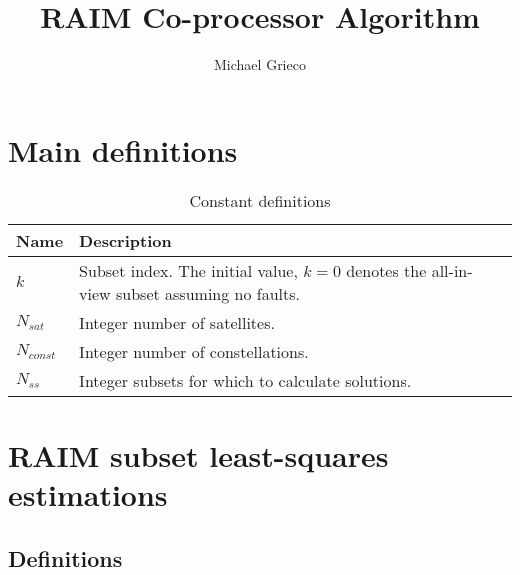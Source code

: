 \documentclass[11pt]{article}
\title{RAIM Co-processor Algorithm}
\author{Michael Grieco}
\date{}
\begin{document}
\section{Main definitions}

\begin{table}[htbp] \centering
  \caption{Constant definitions}\label{tab:exp}
  \begin{tabular}{|m{2cm}|m{11cm}|}
    \hline
    \textbf{Name} & \textbf{Description}\\ \hline
    $k$ & Subset index. The initial value, $k=0$ denotes the all-in-view subset assuming no faults.\\ \hline
    $N_{sat}$ & Integer number of satellites.\\ \hline
    $N_{const}$ & Integer number of constellations.\\ \hline
    $N_{ss}$ & Integer subsets for which to calculate solutions.\\ \hline
  \end{tabular}
\end{table}

\section{RAIM subset least-squares estimations}

\subsection{Definitions}
\end{document}
